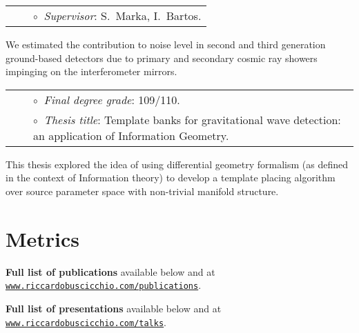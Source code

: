 \vspace{0.2cm}
\vspace{-0.1cm}
\begin{tabular}{rcl}
&\hspace{0.4cm} &$\circ\;\;${\textit{Supervisor}}: S.~Marka, I.~Bartos.
\end{tabular}
\vspace{0.2cm}

We estimated the contribution to noise level in second and third generation ground-based detectors due to primary and secondary cosmic ray showers impinging on the interferometer mirrors.

\vspace{0.2cm}
\vspace{-0.1cm}
\begin{tabular}{rcl}
&\hspace{0.4cm} &$\circ\;\;${\textit{Final degree grade}}: 109/110.\\
&\hspace{0.4cm} &$\circ\;\;${\textit{Thesis title}}: Template banks for gravitational wave detection: an application of Information Geometry.
\end{tabular}
\vspace{0.2cm}


This thesis explored the idea of using differential geometry formalism (as defined in the context of Information theory) to develop a template placing algorithm over source parameter space with non-trivial manifold structure.

\newpage{}


\section{Metrics}



\textbf{Full list of publications} available 
below and
at \href{http://www.riccardobuscicchio.com/publications}{\texttt{www.riccardobuscicchio.com/publications}}.

%

\textbf{Full list of presentations} available
below and
at \href{http://www.riccardobuscicchio.com/talks}{\texttt{www.riccardobuscicchio.com/talks}}.

